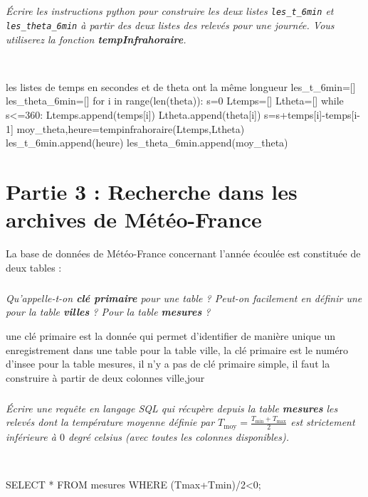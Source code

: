 \documentclass[10pt,fleqn]{article} %
\begin{document}
\subparagraph{}
\textit{Écrire les instructions python pour construire les deux listes \texttt{les\_t\_6min} et \texttt{les\_theta\_6min} à partir des deux listes des relevés pour une journée. Vous utiliserez la fonction \textbf{tempInfrahoraire}.}

\ifprof
\begin{corrige}~\
\begin{python}
les listes de temps en secondes et de theta ont la même longueur
les_t_6min=[]
les_theta_6min=[]
for i in range(len(theta)):
    s=0
    Ltemps=[]
    Ltheta=[]
    while s<=360:
        Ltemps.append(temps[i])
        Ltheta.append(theta[i])
        s=s+temps[i]-temps[i-1]
    moy_theta,heure=tempinfrahoraire(Ltemps,Ltheta)
    les_t_6min.append(heure)
    les_theta_6min.append(moy_theta)
\end{python}
\end{corrige}
\else
\fi

\section*{Partie 3 : Recherche dans les archives de Météo-France}
La base de données de Météo-France concernant l'année écoulée est 
constituée de deux tables :\\
	
\subparagraph{} 	\textit{Qu'appelle-t-on \textbf{clé primaire} pour une table ? 
	Peut-on facilement en définir une pour la table \textbf{villes} ? 
	Pour la table \textbf{mesures} ?}
	
\ifprof
\begin{corrige}
une clé primaire est la donnée qui permet d'identifier de manière unique un enregistrement dans une table
pour la table ville, la clé primaire est le numéro d'insee
pour la table mesures, il n'y a pas de clé primaire simple, il faut la construire à partir de deux colonnes ville,jour
\end{corrige}
\else
\fi
	
\subparagraph{} 	
\textit{ Écrire une requête en langage SQL qui récupère depuis la table 
	\textbf{mesures} les relevés dont la température moyenne définie par 
	$T_{\text{moy}}=\frac{T_{\text{min}}+T_{\text{max}}}{2}$ est strictement inférieure à $0$ degré celsius
		 (avec 	toutes les colonnes disponibles). }
		 
\ifprof
\begin{corrige}~\
\begin{python}
SELECT * FROM mesures WHERE (Tmax+Tmin)/2<0;
\end{python}
\end{corrige}
\else
\fi
	
\end{document}
